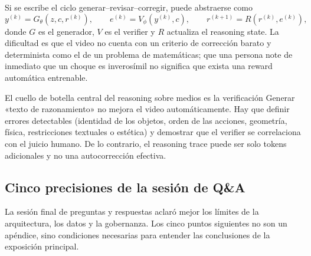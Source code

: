 
Si se escribe el ciclo generar--revisar--corregir, puede abstraerse como
\[
y^{(k)}=G_\theta(z,c,r^{(k)}),\qquad
e^{(k)}=V_\phi(y^{(k)},c),\qquad
r^{(k+1)}=R(r^{(k)},e^{(k)}),
\]
donde $G$ es el generador, $V$ es el verifier y $R$ actualiza el reasoning state. La dificultad es que el video no cuenta con un criterio de corrección barato y determinista como el de un problema de matemáticas; que una persona note de inmediato que un choque es inverosímil no significa que exista una reward automática entrenable.

\begin{importantbox}{El cuello de botella central del reasoning sobre medios es la verificación}
Generar «texto de razonamiento» no mejora el video automáticamente. Hay que definir errores detectables (identidad de los objetos, orden de las acciones, geometría, física, restricciones textuales o estética) y demostrar que el verifier se correlaciona con el juicio humano. De lo contrario, el reasoning trace puede ser solo tokens adicionales y no una autocorrección efectiva.
\end{importantbox}

\subsection{Cinco precisiones de la sesión de Q\&A}

La sesión final de preguntas y respuestas aclaró mejor los límites de la arquitectura, los datos y la gobernanza. Los cinco puntos siguientes no son un apéndice, sino condiciones necesarias para entender las conclusiones de la exposición principal.

